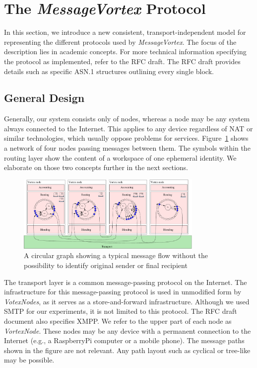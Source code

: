 \documentclass[acmsmall, screen, final]{acmart}
\begin{document}
	\section{The \emph{MessageVortex} Protocol\label{sec:protocol}}
	In this section, we introduce a new consistent, transport-independent model for representing the different protocols used by \emph{MessageVortex}. The focus of the description lies in academic concepts. For more technical information specifying the protocol as implemented, refer to the RFC draft\cite{MessageVortexRFC}. The RFC draft provides details such as specific ASN.1 structures outlining every single block.
	
	\subsection{General Design}
	Generally, our system consists only of nodes, whereas a node may be any system always connected to the Internet. This applies to any device regardless of NAT or similar technologies, which usually oppose problems for services. Figure~\ref{fig:protocolLayers} shows a network of four nodes passing messages between them. The symbols within the routing layer show the content of a workspace of one ephemeral identity. We elaborate on those two concepts further in the next sections. 
	
	\begin{figure}[ht]
		\centering\includegraphics[width=0.8\textwidth]{roughProtocolDesign}
		\caption{A circular graph showing a typical message flow without the possibility to identify original sender or final recipient}
		\label{fig:protocolLayers}
	\end{figure}
	
	The transport layer is a common message-passing protocol on the Internet. The infrastructure for this message-passing protocol is used in unmodified form by \emph{VotexNodes}, as it serves as a store-and-forward infrastructure. Although we used SMTP for our experiments, it is not limited to this protocol. The RFC draft document also specifies XMPP. We refer to the upper part of each node as \emph{VortexNode}. These nodes may be any device with a permanent connection to the Internet (e.g., a RaspberryPi computer or a mobile phone). The message paths shown in the figure are not relevant. Any path layout such as cyclical or tree-like may be possible.
	
\end{document}
